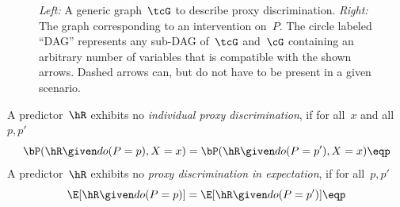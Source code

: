 \begin{figure}
  \centering
  \hspace{2cm}
  \caption{{\em Left:} A generic graph~$\tcG$ to describe proxy discrimination.
  {\em Right:} The graph corresponding to an intervention on~$P$. The circle
  labeled ``DAG'' represents any sub-DAG of~$\tcG$ and~$\cG$ containing an
  arbitrary number of variables that is compatible with the shown arrows. Dashed
  arrows can, but do not have to be present in a given scenario.}
\label{fig:generalgraph}
\end{figure}

\begin{definition}\label{def:nondisc}
  A predictor~$\hR$ exhibits no \emph{individual proxy discrimination}, if for
  all~$x$ and all~$p, p'$
  \begin{equation*}
    \bP(\hR \given do(P=p), X=x) = \bP(\hR \given do(P=p'), X=x) \eqp
  \end{equation*}
  A predictor~$\hR$ exhibits no \emph{proxy discrimination in expectation}, if
  for all~$p, p'$
  \begin{equation*}
    \E[\hR \given do(P=p)] = \E[\hR \given do(P=p')] \eqp \label{eq:inexp}
  \end{equation*}
\end{definition}

